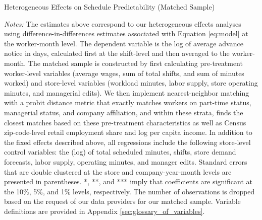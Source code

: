 \documentclass[letterpaper,11pt,leqno]{article}
\theoremstyle{paper}
\newcommand{\note}[2][]{\parbox{\textwidth}{\footnotesize\vspace*{10pt}\textit{#1}#2}}
\begin{document}
\begin{singlespace}
\begin{table}[h]
\caption{Heterogeneous Effects on Schedule Predictability (Matched Sample)}

\note{\scriptsize\textit{Notes: }The estimates above correspond to our heterogeneous effects analyses using difference-in-differences estimates associated with Equation \ref{eq:model} at the worker-month level. The dependent variable is the log of average advance notice in days, calculated first at the shift-level and then averaged to the worker-month. The matched sample is constructed by first calculating pre-treatment worker-level variables (average wages, sum of total shifts, and sum of minutes worked) and store-level variables (workload minutes, labor supply, store operating minutes, and managerial edits). We then implement nearest-neighbor matching with a probit distance metric that exactly matches workers on part-time status, managerial status, and company affiliation, and within these strata, finds the closest matches based on these pre-treatment characteristics as well as Census zip-code-level retail employment share and log per capita income. In addition to the fixed effects described above, all regressions include the following store-level control variables: the (log) of total scheduled minutes, shifts, store demand forecasts, labor supply, operating minutes, and manager edits. Standard errors that are double clustered at the store and company-year-month levels are presented in parentheses. *, **, and *** imply that coefficients are significant at the 10\%, 5\%, and 1\% levels, respectively. The number of observations is dropped based on the request of our data providers for our matched sample. Variable definitions are provided in Appendix \ref{sec:glossary_of_variables}.}
\label{table:adv_notice_het_effects_matched}
\end{table}
\end{singlespace}
\end{document}
